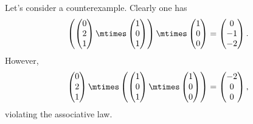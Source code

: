 \begin{solution}
    Let's consider a counterexample.
    Clearly one has
    \begin{equation}
        \left(\begin{pmatrix}
                  0\\ 2\\ 1
        \end{pmatrix}\mtimes \begin{pmatrix}
                                 1\\ 0 \\ 1
        \end{pmatrix}\right)\mtimes
        \begin{pmatrix}
            1\\ 0 \\ 0
        \end{pmatrix}=\begin{pmatrix}
                          0\\-1\\-2
        \end{pmatrix}.
    \end{equation}
    However,
    \begin{equation}
        \begin{pmatrix}
            0\\ 2\\ 1
        \end{pmatrix}\mtimes \left(\begin{pmatrix}
                                       1\\ 0 \\ 1
        \end{pmatrix}\mtimes
        \begin{pmatrix}
            1\\ 0 \\ 0
        \end{pmatrix}\right)
        =\begin{pmatrix}
             -2\\0\\0
        \end{pmatrix},
    \end{equation}
    violating the associative law.
\end{solution}


